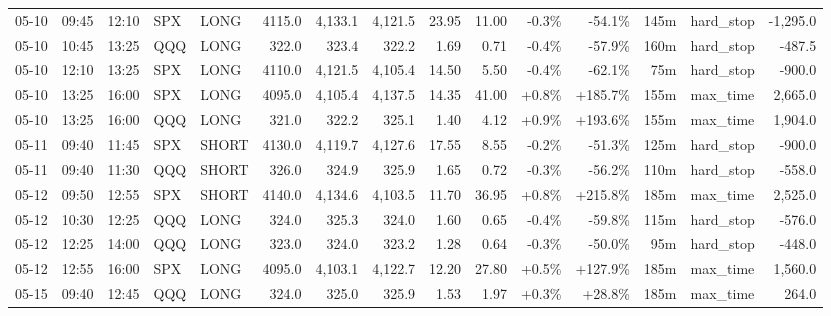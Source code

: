\documentclass[11pt,a4paper,twoside]{article}
\begin{document}
\begin{landscape}
\begin{center}
\begin{longtable}{>{\color{txtmain}}l l l l l r r r r r r r r >{\color{txtmain}}l r}
05-10 & 09:45 & 12:10 & SPX & LONG & 4115.0 & 4,133.1 & 4,121.5 & 23.95 & 11.00 & \textcolor{lossred}{-0.3\%} & \textcolor{lossred}{-54.1\%} & 145m & hard\_stop & \textcolor{lossred}{-1,295.0} \\
05-10 & 10:45 & 13:25 & QQQ & LONG & 322.0 & 323.4 & 322.2 & 1.69 & 0.71 & \textcolor{lossred}{-0.4\%} & \textcolor{lossred}{-57.9\%} & 160m & hard\_stop & \textcolor{lossred}{-487.5} \\
05-10 & 12:10 & 13:25 & SPX & LONG & 4110.0 & 4,121.5 & 4,105.4 & 14.50 & 5.50 & \textcolor{lossred}{-0.4\%} & \textcolor{lossred}{-62.1\%} & 75m & hard\_stop & \textcolor{lossred}{-900.0} \\
05-10 & 13:25 & 16:00 & SPX & LONG & 4095.0 & 4,105.4 & 4,137.5 & 14.35 & 41.00 & \textcolor{wingreen}{+0.8\%} & \textcolor{wingreen}{+185.7\%} & 155m & max\_time & \textcolor{wingreen}{2,665.0} \\
05-10 & 13:25 & 16:00 & QQQ & LONG & 321.0 & 322.2 & 325.1 & 1.40 & 4.12 & \textcolor{wingreen}{+0.9\%} & \textcolor{wingreen}{+193.6\%} & 155m & max\_time & \textcolor{wingreen}{1,904.0} \\
05-11 & 09:40 & 11:45 & SPX & SHORT & 4130.0 & 4,119.7 & 4,127.6 & 17.55 & 8.55 & \textcolor{lossred}{-0.2\%} & \textcolor{lossred}{-51.3\%} & 125m & hard\_stop & \textcolor{lossred}{-900.0} \\
05-11 & 09:40 & 11:30 & QQQ & SHORT & 326.0 & 324.9 & 325.9 & 1.65 & 0.72 & \textcolor{lossred}{-0.3\%} & \textcolor{lossred}{-56.2\%} & 110m & hard\_stop & \textcolor{lossred}{-558.0} \\
05-12 & 09:50 & 12:55 & SPX & SHORT & 4140.0 & 4,134.6 & 4,103.5 & 11.70 & 36.95 & \textcolor{wingreen}{+0.8\%} & \textcolor{wingreen}{+215.8\%} & 185m & max\_time & \textcolor{wingreen}{2,525.0} \\
05-12 & 10:30 & 12:25 & QQQ & LONG & 324.0 & 325.3 & 324.0 & 1.60 & 0.65 & \textcolor{lossred}{-0.4\%} & \textcolor{lossred}{-59.8\%} & 115m & hard\_stop & \textcolor{lossred}{-576.0} \\
05-12 & 12:25 & 14:00 & QQQ & LONG & 323.0 & 324.0 & 323.2 & 1.28 & 0.64 & \textcolor{lossred}{-0.3\%} & \textcolor{lossred}{-50.0\%} & 95m & hard\_stop & \textcolor{lossred}{-448.0} \\
05-12 & 12:55 & 16:00 & SPX & LONG & 4095.0 & 4,103.1 & 4,122.7 & 12.20 & 27.80 & \textcolor{wingreen}{+0.5\%} & \textcolor{wingreen}{+127.9\%} & 185m & max\_time & \textcolor{wingreen}{1,560.0} \\
05-15 & 09:40 & 12:45 & QQQ & LONG & 324.0 & 325.0 & 325.9 & 1.53 & 1.97 & \textcolor{wingreen}{+0.3\%} & \textcolor{wingreen}{+28.8\%} & 185m & max\_time & \textcolor{wingreen}{264.0} \\

\end{longtable}
\end{center}
\end{landscape}
\end{document}
